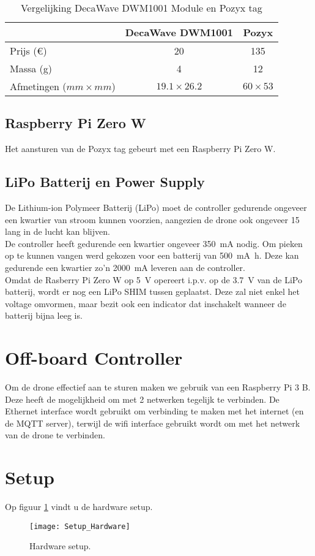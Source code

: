 \begin{table}[p]
\centering
\begin{tabular}{ | l | c | c | } \hline
& DecaWave DWM1001 & Pozyx \\
\hline 
\hline
Prijs (\euro{}) & 20 & 135 \\ 
\hline
Massa (g) & 4 & 12 \\ 
\hline
Afmetingen ($mm \times mm$) & $19.1 \times 26.2$ & $60 \times 53$ \\ 
\hline
\end{tabular}
\caption[Vergelijking DecaWave DWM1001 Module en Pozyx tag]{Vergelijking DecaWave DWM1001 Module en Pozyx tag}
\label{tab:decavspozyx}
\end{table}

\subsection{Raspberry Pi Zero W} \label{sec:raspberry_pi}

Het aansturen van de Pozyx tag gebeurt met een Raspberry Pi Zero W. 

\subsection{LiPo Batterij en Power Supply} \label{sec:lipo}
De Lithium-ion Polymeer Batterij (LiPo) moet de controller gedurende ongeveer een kwartier van stroom kunnen voorzien, aangezien de drone ook ongeveer \SI{15}{\min} lang in de lucht kan blijven.\\
De controller heeft gedurende een kwartier ongeveer \SI{350}{\mA} nodig. Om pieken op te kunnen vangen werd gekozen voor een batterij van \SI{500}{\mA\hour}. Deze kan gedurende een kwartier zo'n \SI{2000}{\mA} leveren aan de controller.\\

Omdat de Rasberry Pi Zero W op \SI{5}{\V} opereert i.p.v. op de \SI{3.7}{\V} van de LiPo batterij, wordt er nog een LiPo SHIM tussen geplaatst. Deze zal niet enkel het voltage omvormen, maar bezit ook een indicator dat inschakelt wanneer de batterij bijna leeg is.

\section{Off-board Controller} \label{sec:offboard_controller}
Om de drone effectief aan te sturen maken we gebruik van een Raspberry Pi 3 B. Deze heeft de mogelijkheid om met 2 netwerken tegelijk te verbinden. De Ethernet interface wordt gebruikt om verbinding te maken met het internet (en de MQTT server), terwijl de wifi interface gebruikt wordt om met het netwerk van de drone te verbinden.

\section{Setup} \label{sec:setup_hardware}
Op figuur \ref{fig:setup_hardware} vindt u de hardware setup.
\begin{figure}[p]
	\centering
	\texttt{[image: Setup\_Hardware]}
	\caption[Hardware setup]{Hardware setup.}
	\label{fig:setup_hardware}
\end{figure}